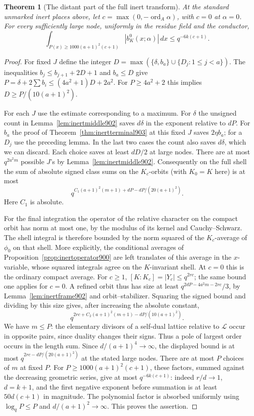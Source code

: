 \documentclass[a4paper,11pt]{article}
\newtheorem{theorem}[proposition]{Theorem}
\theoremstyle{definition}
\theoremstyle{remark}
\numberwithin{equation}{section}
\begin{document}
\begin{theorem}[The distant part of the full inert transform]
\leavevmode\label{thm:inerttail904}
At the standard unmarked inert places above, let
\(c=\max(0,-\operatorname{ord}_A\alpha)\), with \(c=0\) at
\(\alpha=0\). For every sufficiently large node, uniformly in
the residue field and the conductor,
\[
    \int_{P(x)\ge1000(a+1)^2(c+1)}
                   |b^0_K(x;\alpha)|\,dx
                         \le q^{-6k(c+1)}.
\]
\end{theorem}
\begin{proof}
For fixed \(J\) define the integer
\(D=\max(\{\delta,b_a\}\cup\{D_j:1\le j<a\})\).
The inequalities \(b_j\le b_{j+1}+2D+1\) and \(b_a\le D\)
give \(P=\delta+2\sum b_i\le(4a^2+1)D+2a^2\).
For \(P\ge4a^2+2\) this implies
\(D\ge P/(10(a+1)^2)\).

For each \(J\) use the estimate corresponding to a maximum.
For \(\delta\) the unsigned count in
Lemma~\ref{lem:inertmiddle902} saves \(d\delta\) in the
exponent relative to \(dP\). For \(b_a\) the proof of
Theorem~\ref{thm:inertterminal903} at this fixed \(J\)
saves \(2\eta b_a\); for a \(D_j\) use the preceding lemma.
In the last two cases the count also saves \(d\delta\), which
we can discard. Each choice saves at least \(dD/2\) at large
nodes. There are at most \(q^{2a^2m}\) possible \(J\)'s by
Lemma~\ref{lem:inertmiddle902}. Consequently on the full shell
the sum of absolute signed class sums on the \(K_c\)-orbits
(with \(K_0=K\) here) is at most
\[
 q^{C_1(a+1)^2(m+1)+dP-dP/(20(a+1)^2)} .
\]
Here \(C_1\) is absolute.

For the final integration the operator of the relative character
on the compact orbit has norm at most one, by the modulus of
its kernel and Cauchy--Schwarz. The shell integral is therefore
bounded by the norm squared of the \(K_c\)-average of \(\phi_0\)
on that shell. More explicitly, the conditional averages of
Proposition~\ref{prop:inertoperator900} are left translates of
this average in the \(x\)-variable, whose squared integrals
agree on the \(K\)-invariant shell. At \(c=0\) this is the
ordinary compact average. For \(c\ge1\), \([K:K_c]=|Y_c|
\le q^{2rc}\); the same bound one applies for \(c=0\).
A refined orbit thus has size at least
\(q^{2dP-4a^2m-2rc}/3\), by Lemma~\ref{lem:inertframe902}
and orbit--stabilizer. Squaring the signed bound and dividing
by this size gives, after increasing the absolute constant,
\[
               q^{2rc+C_2(a+1)^2(m+1)-dP/(10(a+1)^2)} .
\]
We have \(m\le P\): the elementary divisors of a self-dual
lattice relative to \(\mathcal L\) occur in opposite pairs,
since duality changes their signs. Thus a pole of largest
order occurs in the length sum. Since \(d/(a+1)^4\to\infty\),
the displayed bound is at most \(q^{2rc-dP/(20(a+1)^2)}\)
at the stated large nodes. There are at most \(P\) choices
of \(m\) at fixed \(P\). For \(P\ge1000(a+1)^2(c+1)\),
these factors, summed against the decreasing geometric series,
give at most \(q^{-6k(c+1)}\): indeed \(r/d\to1\),
\(d=k+1\), and the first negative exponent before summation
is at least \(50d(c+1)\) in magnitude. The polynomial factor
is absorbed uniformly using \(\log_q P\le P\) and
\(d/(a+1)^2\to\infty\). This proves the assertion.
\end{proof}
\end{document}
